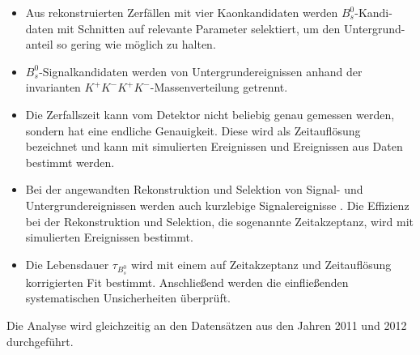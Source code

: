 \documentclass{article}
\begin{document}
\begin{itemize}
\item Aus rekonstruierten Zerfällen mit vier Kaonkandidaten werden $B_s^0$-Kandi-daten mit Schnitten auf relevante Parameter selektiert, um den Untergrund-anteil so gering wie möglich zu halten.%
\item $B_s^0$-Signalkandidaten werden von Untergrundereignissen anhand der invarianten $K^+K^-K^+K^-$-Massenverteilung getrennt. 
\item Die Zerfallszeit kann vom Detektor nicht beliebig genau gemessen werden, sondern hat eine endliche Genauigkeit. Diese wird als Zeitauflösung bezeichnet und kann mit simulierten Ereignissen und Ereignissen aus Daten bestimmt werden.
\item Bei der angewandten Rekonstruktion und Selektion von Signal- und Untergrundereignissen werden auch kurzlebige Signalereignisse . Die Effizienz bei der Rekonstruktion und Selektion, die sogenannte Zeitakzeptanz, wird mit simulierten Ereignissen bestimmt.

\item Die Lebensdauer $\tau_{B_s^0}$ wird mit einem auf Zeitakzeptanz und Zeitauflösung korrigierten Fit bestimmt. Anschließend werden die einfließenden systematischen Unsicherheiten überprüft.
\end{itemize}
Die Analyse wird gleichzeitig an den Datensätzen aus den Jahren 2011 und 2012 durchgeführt.
\end{document}
